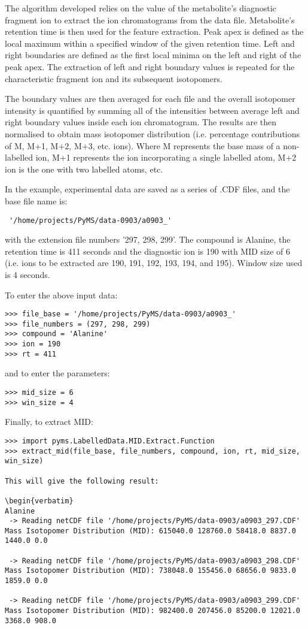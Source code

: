 The algorithm developed relies on the value of the metabolite’s diagnostic
fragment ion to extract the ion chromatograms from the data file.
Metabolite’s retention time is then used for the feature extraction. Peak
apex is defined as the local maximum within a specified window of the given
retention time. Left and right boundaries are defined as the first local minima on
the left and right of the peak apex. The extraction of left and right boundary
values is repeated for the characteristic fragment ion and its subsequent
isotopomers.

The boundary values are then averaged for each file and the overall isotopomer
intensity is quantified by summing all of the intensities between average left and
right boundary values inside each ion chromatogram. The results are
then normalised to obtain mass isotopomer distribution (i.e. percentage
contributions of M, M+1, M+2, M+3, etc. ions). Where M represents the base mass of 
a non-labelled ion, M+1 represents the ion incorporating a single labelled atom, 
M+2 ion is the one with two labelled atoms, etc.

In the example, experimental data are saved as a series of .CDF files, and the base 
file name is:
\begin{verbatim}
 '/home/projects/PyMS/data-0903/a0903_'
\end{verbatim}
 with the extension file numbers '297, 298, 299'. The compound is Alanine, the 
retention time is 411 seconds and the diagnostic ion is 190 with MID size of 6 
(i.e. ions to be extracted are 190, 191, 192, 193, 194, and 195). Window size 
used is 4 seconds.

To enter the above input data:

\begin{verbatim}
>>> file_base = '/home/projects/PyMS/data-0903/a0903_'
>>> file_numbers = (297, 298, 299)
>>> compound = 'Alanine'
>>> ion = 190
>>> rt = 411 
\end{verbatim}

and to enter the parameters:

\begin{verbatim} 
>>> mid_size = 6 
>>> win_size = 4 
\end{verbatim}

Finally, to extract MID:
\begin{verbatim}
>>> import pyms.LabelledData.MID.Extract.Function
>>> extract_mid(file_base, file_numbers, compound, ion, rt, mid_size, win_size)

This will give the following result:

\begin{verbatim}
Alanine
 -> Reading netCDF file '/home/projects/PyMS/data-0903/a0903_297.CDF'
Mass Isotopomer Distribution (MID): 615040.0 128760.0 58418.0 8837.0 1440.0 0.0 

 -> Reading netCDF file '/home/projects/PyMS/data-0903/a0903_298.CDF'
Mass Isotopomer Distribution (MID): 738048.0 155456.0 68656.0 9833.0 1859.0 0.0 

 -> Reading netCDF file '/home/projects/PyMS/data-0903/a0903_299.CDF'
Mass Isotopomer Distribution (MID): 982400.0 207456.0 85200.0 12021.0 3368.0 908.0 
\end{verbatim}


